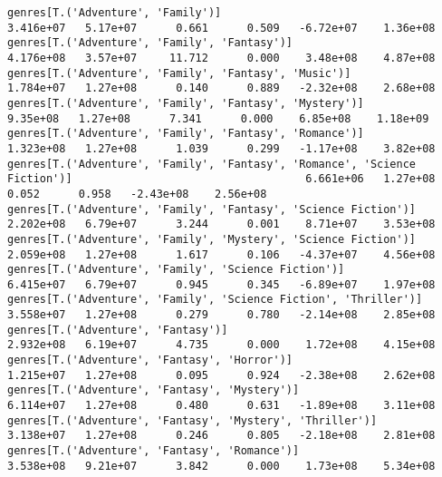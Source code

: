 \documentclass[11pt]{article}
\begin{document}
\begin{Verbatim}[commandchars=\\\{\}]
genres[T.('Adventure', 'Family')]                                                                             3.416e+07   5.17e+07      0.661      0.509   -6.72e+07    1.36e+08
genres[T.('Adventure', 'Family', 'Fantasy')]                                                                  4.176e+08   3.57e+07     11.712      0.000    3.48e+08    4.87e+08
genres[T.('Adventure', 'Family', 'Fantasy', 'Music')]                                                         1.784e+07   1.27e+08      0.140      0.889   -2.32e+08    2.68e+08
genres[T.('Adventure', 'Family', 'Fantasy', 'Mystery')]                                                        9.35e+08   1.27e+08      7.341      0.000    6.85e+08    1.18e+09
genres[T.('Adventure', 'Family', 'Fantasy', 'Romance')]                                                       1.323e+08   1.27e+08      1.039      0.299   -1.17e+08    3.82e+08
genres[T.('Adventure', 'Family', 'Fantasy', 'Romance', 'Science Fiction')]                                    6.661e+06   1.27e+08      0.052      0.958   -2.43e+08    2.56e+08
genres[T.('Adventure', 'Family', 'Fantasy', 'Science Fiction')]                                               2.202e+08   6.79e+07      3.244      0.001    8.71e+07    3.53e+08
genres[T.('Adventure', 'Family', 'Mystery', 'Science Fiction')]                                               2.059e+08   1.27e+08      1.617      0.106   -4.37e+07    4.56e+08
genres[T.('Adventure', 'Family', 'Science Fiction')]                                                          6.415e+07   6.79e+07      0.945      0.345   -6.89e+07    1.97e+08
genres[T.('Adventure', 'Family', 'Science Fiction', 'Thriller')]                                              3.558e+07   1.27e+08      0.279      0.780   -2.14e+08    2.85e+08
genres[T.('Adventure', 'Fantasy')]                                                                            2.932e+08   6.19e+07      4.735      0.000    1.72e+08    4.15e+08
genres[T.('Adventure', 'Fantasy', 'Horror')]                                                                  1.215e+07   1.27e+08      0.095      0.924   -2.38e+08    2.62e+08
genres[T.('Adventure', 'Fantasy', 'Mystery')]                                                                 6.114e+07   1.27e+08      0.480      0.631   -1.89e+08    3.11e+08
genres[T.('Adventure', 'Fantasy', 'Mystery', 'Thriller')]                                                     3.138e+07   1.27e+08      0.246      0.805   -2.18e+08    2.81e+08
genres[T.('Adventure', 'Fantasy', 'Romance')]                                                                 3.538e+08   9.21e+07      3.842      0.000    1.73e+08    5.34e+08

\end{Verbatim}
\end{document}
